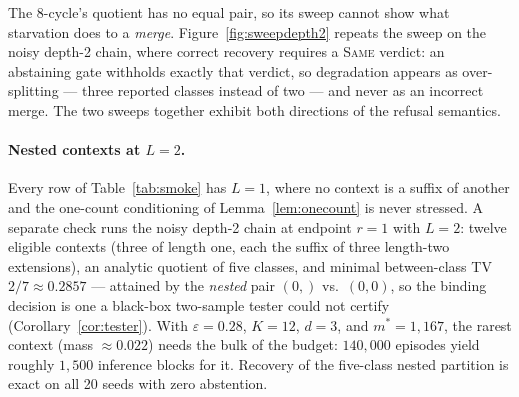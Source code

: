\documentclass{article}
\newcommand{\eps}{\varepsilon}
\begin{document}
The 8-cycle's quotient has no equal pair, so its sweep cannot show what
starvation does to a \emph{merge}.  Figure~\ref{fig:sweepdepth2} repeats
the sweep on the noisy depth-2 chain, where correct recovery requires a
\textsc{Same} verdict: an abstaining gate withholds exactly that verdict,
so degradation appears as over-splitting --- three reported classes instead
of two --- and never as an incorrect merge.  The two sweeps together
exhibit both directions of the refusal semantics.

\paragraph{Nested contexts at $L=2$.}
Every row of Table~\ref{tab:smoke} has $L=1$, where no context is a suffix
of another and the one-count conditioning of Lemma~\ref{lem:onecount} is
never stressed.  A separate check runs the noisy depth-2 chain at endpoint
$r=1$ with $L=2$: twelve eligible contexts (three of length one, each the
suffix of three length-two extensions), an analytic quotient of five
classes, and minimal between-class TV $2/7\approx0.2857$ --- attained by
the \emph{nested} pair $(0,)$ vs.\ $(0,0)$, so the binding decision is one
a black-box two-sample tester could not certify
(Corollary~\ref{cor:tester}).  With $\eps=0.28$, $K=12$, $d=3$, and
$m^*=1{,}167$, the rarest context (mass $\approx0.022$) needs the bulk of
the budget: $140{,}000$ episodes yield roughly $1{,}500$ inference blocks
for it.  Recovery of the five-class nested partition is exact on all 20
seeds with zero abstention.
\end{document}
